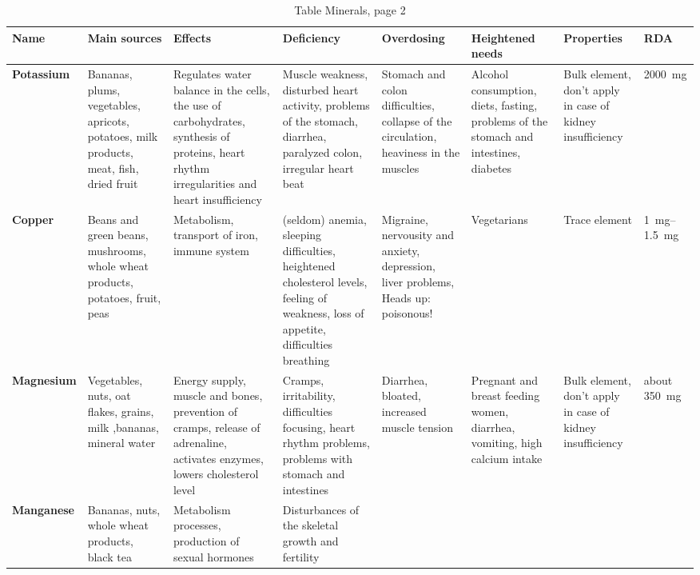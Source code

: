 \documentclass[../main.tex]{subfiles}
\begin{document}
\begin{sidewaystable}[p!]
  \caption{Table Minerals, page 2}
  \centering
  \begin{small}
  \begin{tabularx}{\textwidth}{p{1.2cm}p{2.5cm}p{3cm}p{3cm}p{2.3cm}p{2.5cm}p{3cm}p{1cm}}
    \toprule 
    \textbf{Name} &\textbf{Main sources} & \textbf{Effects} &\textbf{Deficiency} & \textbf{Overdosing} & \textbf{Heightened needs} & \textbf{Properties} & \textbf{RDA} \\
    \midrule
    \textbf{Pot\-ass\-ium}\index{mineral!potassium} &
    Bananas, plums, vegetables, apricots, potatoes, milk products, meat, fish, dried fruit &
    Regulates water balance in the cells, the use of carbohydrates, synthesis of proteins, heart rhythm irregularities and heart insufficiency &
    Muscle weakness, disturbed heart activity, problems of the stomach, diarrhea, paralyzed colon, irregular heart beat &
    Stomach and colon difficulties, collapse of the circulation, heaviness in the muscles &
    Alcohol consumption, diets, fasting, problems of the stomach and intestines, diabetes &
    Bulk element, don't apply in case of kidney insufficiency &
    \SI{2000}{\mg} \\
    \textbf{Cop\-per}\index{mineral!copper} &
    Beans and green beans, mushrooms, whole wheat products, potatoes, fruit, peas &
    Metabolism, transport of iron, immune system &
    (seldom) anemia, sleeping difficulties, heightened cholesterol levels, feeling of weakness,  loss of appetite, difficulties breathing &
    Migraine, nervousity and anxiety, depression, liver problems, Heads up: poisonous! &
    Vegetarians &
    Trace element &
    \SIrange{1}{1.5}{\mg} \\
    \textbf{Mag\-ne\-si\-um}\index{mineral!magnesium} &
    Vegetables, nuts, oat flakes, grains, milk ,bananas, mineral water &
    Energy supply, muscle and bones, prevention of cramps, release of adrenaline, activates enzymes, lowers cholesterol level &
    Cramps, irritability, difficulties focusing, heart rhythm problems, problems with stomach and intestines &
    Diarrhea, bloated, increased muscle tension &
    Pregnant and breast feeding women, diarrhea, vomiting, high calcium intake &
    Bulk element, don't apply in case of kidney insufficiency &
    about \SI{350}{mg} \\
    \textbf{Man\-ga\-nese}\index{mineral!manganese} &
   Bananas, nuts, whole wheat products, black tea &
    Metabolism processes, production of sexual hormones &
    Disturbances of the skeletal growth and fertility &

\end{tabularx}
\end{small}
\end{sidewaystable}
\end{document}
